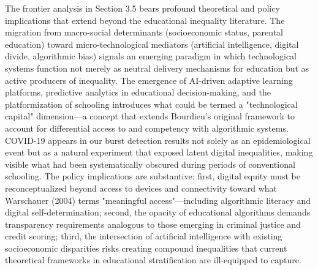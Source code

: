 \documentclass[12pt,a4paper]{article}
\begin{document}
The frontier analysis in Section 3.5 bears profound theoretical and policy implications that extend beyond the educational inequality literature. The migration from macro-social determinants (socioeconomic status, parental education) toward micro-technological mediators (artificial intelligence, digital divide, algorithmic bias) signals an emerging paradigm in which technological systems function not merely as neutral delivery mechanisms for education but as active producers of inequality. The emergence of AI-driven adaptive learning platforms, predictive analytics in educational decision-making, and the platformization of schooling introduces what could be termed a "technological capital" dimension—a concept that extends Bourdieu's original framework to account for differential access to and competency with algorithmic systems. COVID-19 appears in our burst detection results not solely as an epidemiological event but as a natural experiment that exposed latent digital inequalities, making visible what had been systematically obscured during periods of conventional schooling. The policy implications are substantive: first, digital equity must be reconceptualized beyond access to devices and connectivity toward what Warschauer (2004) terms "meaningful access"—including algorithmic literacy and digital self-determination; second, the opacity of educational algorithms demands transparency requirements analogous to those emerging in criminal justice and credit scoring; third, the intersection of artificial intelligence with existing socioeconomic disparities risks creating compound inequalities that current theoretical frameworks in educational stratification are ill-equipped to capture.
\end{document}
